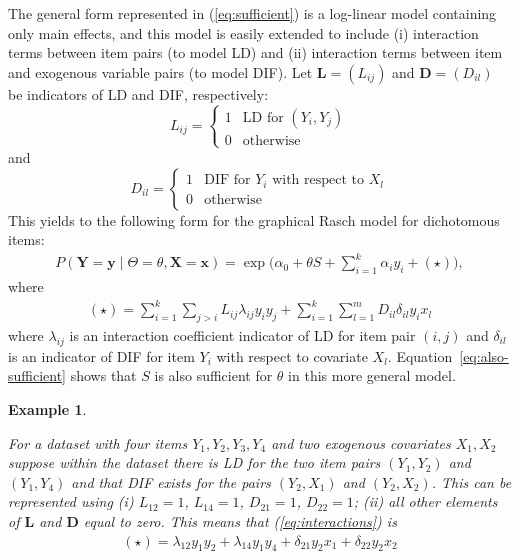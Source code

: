 \documentclass[12pt]{article}
\newcommand{\coauthortodo}[1]{%
  \marginnote{%
    \begin{tcolorbox}[
      width=\marginparwidth,
      colback=yellow!15!white, colframe=orange!70!black,
      colbacktitle=yellow!35!white, coltitle=black,
      title=TODO, fonttitle=\bfseries\scriptsize,
      toptitle=2pt, bottomtitle=2pt,
      fontupper=\scriptsize, boxrule=0.4pt, arc=1mm,
      boxsep=0pt, left=2pt, right=2pt, top=3pt, bottom=3pt,
      before skip=0pt, after skip=0pt
    ]
      \raggedright #1
    \end{tcolorbox}%
  }%
}
\theoremstyle{examplestyle}
\newtheorem{example}{Example}[section]
\begin{document}
The general form represented in (\ref{eq:sufficient}) is a log-linear model containing only main effects, and this model is easily extended to include (i) interaction terms between item pairs (to model LD) and (ii) interaction terms between item and exogenous variable pairs (to model DIF). Let $\boldsymbol{L}=(L_{ij})$ and $\boldsymbol{D}=(D_{il})$ be indicators of LD and DIF, respectively:
$$
L_{ij} = \begin{cases}
1 & \textrm{LD for }(Y_i,Y_j)\\
0 & \textrm{otherwise}
\end{cases}
$$
and
$$
D_{il} = \begin{cases}
1 & \textrm{DIF for }Y_i\textrm{ with respect to }X_l\\
0 & \textrm{otherwise}
\end{cases}
$$
This yields to the following form for the graphical Rasch model for dichotomous items:
\begin{align}
P(\mathbf{Y}=\mathbf{y}\mid \Theta=\theta,\mathbf{X}=\mathbf{x}) = \exp\Big(\alpha_0+\theta S+\sum_{i=1}^k\alpha_iy_i+(\star)\Big),
\label{eq:also-sufficient}
\end{align}
where
\begin{align}
\label{eq:interactions}
(\star)=\sum_{i=1}^{k}\sum_{j>i}L_{ij}\lambda_{ij}y_iy_j+ \sum_{i=1}^{k}\sum_{l=1}^{m}D_{il}\delta_{il}y_ix_l
\end{align}
where $\lambda_{ij}$ is an interaction coefficient indicator of LD for item pair $(i,j)$ and $\delta_{il}$ is an indicator of DIF for item $Y_i$ with respect to covariate $X_l$. Equation~\eqref{eq:also-sufficient} shows that $S$ is also sufficient for $\theta$ in this more general model.

\begin{mybox3}
\begin{example}
\label{ex:gRm-interactions}

For a dataset with four items $Y_1,Y_2,Y_3,Y_4$ and two exogenous covariates $X_1,X_2$ suppose within the dataset there is LD for the two item pairs $(Y_1,Y_2)$ and $(Y_1,Y_4)$ and that DIF exists for the pairs $(Y_2,X_1)$ and $(Y_2,X_2)$. This can be represented using (i) $L_{12}=1$, $L_{14}=1$, $D_{21}=1$, $D_{22}=1$; (ii) all other elements of $\boldsymbol{L}$ and $\boldsymbol{D}$ equal to zero. This means that (\ref{eq:interactions}) is
\begin{align*}
(\star)=\lambda_{12}y_1y_2+\lambda_{14}y_1y_4 +\delta_{21}y_2x_1+\delta_{22}y_2x_2
\end{align*}

\end{example}
\end{mybox3}
\end{document}
